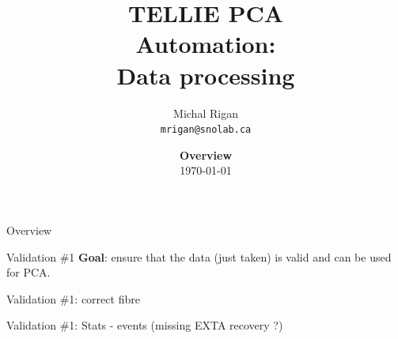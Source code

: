 \documentclass[xcolor=table]{beamer}
\title{TELLIE PCA \\ Automation: \\ Data processing}
\author{Michal Rigan\\ %
          \texttt{mrigan@snolab.ca}} %
\date{\textbf{Overview}\\
\today} %
\institute{University of Sussex} %
\begin{document}
{
\begin{frame}
  \titlepage %
\end{frame}
}

\begin{frame}{Overview}
\noindent{}
\end{frame}

\begin{frame}{Validation \#1}
\textbf{Goal}: ensure that the data (just taken) is valid and can be used for PCA. 
\end{frame}

\begin{frame}{Validation \#1: correct fibre}
\noindent{}
\end{frame}

\begin{frame}{Validation \#1: Stats - events}
\noindent{}
\center (missing EXTA recovery ?)
\end{frame}
\end{document}
